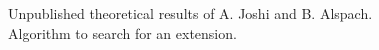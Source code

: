 \documentclass[preview]{standalone}
\begin{document}
Unpublished theoretical results of A. Joshi and B. Alspach.\\Algorithm to search for an extension.\\
\end{document}
